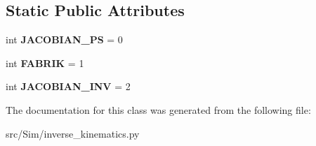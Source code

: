 \subsection*{Static Public Attributes}
\begin{DoxyCompactItemize}
\item 
\mbox{\label{classinverse__kinematics_1_1method_i_k_accf053233216234c1aefcb94554bd148}} 
int {\bfseries J\+A\+C\+O\+B\+I\+A\+N\+\_\+\+PS} = 0
\item 
\mbox{\label{classinverse__kinematics_1_1method_i_k_a705e9e4236af7884c98ff566c16dec2b}} 
int {\bfseries F\+A\+B\+R\+IK} = 1
\item 
\mbox{\label{classinverse__kinematics_1_1method_i_k_a74977b66ae013de67710ee80b806cc52}} 
int {\bfseries J\+A\+C\+O\+B\+I\+A\+N\+\_\+\+I\+NV} = 2
\end{DoxyCompactItemize}


The documentation for this class was generated from the following file\+:\begin{DoxyCompactItemize}
\item 
src/\+Sim/inverse\+\_\+kinematics.\+py\end{DoxyCompactItemize}
